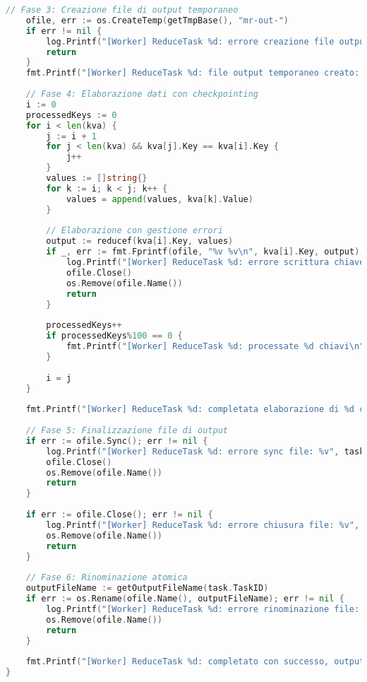 \documentclass[12pt,a4paper]{article}
\begin{document}
\begin{lstlisting}[language=go]
    // Fase 3: Creazione file di output temporaneo
    ofile, err := os.CreateTemp(getTmpBase(), "mr-out-")
    if err != nil {
        log.Printf("[Worker] ReduceTask %d: errore creazione file output: %v", task.TaskID, err)
        return
    }
    fmt.Printf("[Worker] ReduceTask %d: file output temporaneo creato: %s\n", task.TaskID, ofile.Name())
    
    // Fase 4: Elaborazione dati con checkpointing
    i := 0
    processedKeys := 0
    for i < len(kva) {
        j := i + 1
        for j < len(kva) && kva[j].Key == kva[i].Key {
            j++
        }
        values := []string{}
        for k := i; k < j; k++ {
            values = append(values, kva[k].Value)
        }
        
        // Elaborazione con gestione errori
        output := reducef(kva[i].Key, values)
        if _, err := fmt.Fprintf(ofile, "%v %v\n", kva[i].Key, output); err != nil {
            log.Printf("[Worker] ReduceTask %d: errore scrittura chiave %v: %v", task.TaskID, kva[i].Key, err)
            ofile.Close()
            os.Remove(ofile.Name())
            return
        }
        
        processedKeys++
        if processedKeys%100 == 0 {
            fmt.Printf("[Worker] ReduceTask %d: processate %d chiavi\n", task.TaskID, processedKeys)
        }
        
        i = j
    }
    
    fmt.Printf("[Worker] ReduceTask %d: completata elaborazione di %d chiavi\n", task.TaskID, processedKeys)
    
    // Fase 5: Finalizzazione file di output
    if err := ofile.Sync(); err != nil {
        log.Printf("[Worker] ReduceTask %d: errore sync file: %v", task.TaskID, err)
        ofile.Close()
        os.Remove(ofile.Name())
        return
    }
    
    if err := ofile.Close(); err != nil {
        log.Printf("[Worker] ReduceTask %d: errore chiusura file: %v", task.TaskID, err)
        os.Remove(ofile.Name())
        return
    }
    
    // Fase 6: Rinominazione atomica
    outputFileName := getOutputFileName(task.TaskID)
    if err := os.Rename(ofile.Name(), outputFileName); err != nil {
        log.Printf("[Worker] ReduceTask %d: errore rinominazione file: %v", task.TaskID, err)
        os.Remove(ofile.Name())
        return
    }
    
    fmt.Printf("[Worker] ReduceTask %d: completato con successo, output in %s\n", task.TaskID, outputFileName)
}
\end{lstlisting}
\end{document}
